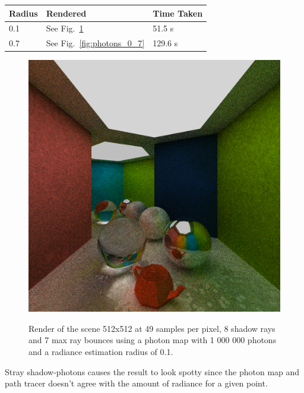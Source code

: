 \documentclass[a4paper, twocolumn]{article}
\begin{document}
        \begin{table}[H]
            \centering
            \begin{tabular}{lll}
                \toprule
                \textbf{Radius}&\textbf{Rendered}&\textbf{Time Taken}\\
                \midrule
                0.1&See Fig.~\ref{fig:photons_0_1}&51.5 s\\
                0.7&See Fig.~\ref{fig:photons_0_7}&129.6 s\\
                \bottomrule
            \end{tabular}
            \label{tab:photon_mapping}
            \end{table}

            \begin{figure}[H]
                \centering
                \caption{Render of the scene 512x512 at 49 samples per pixel, 8 shadow rays and 7 max ray bounces using a photon map with 1 000 000 photons and a radiance estimation radius of 0.1.}
                \includegraphics[width=0.8\linewidth]{share/results/photons_0_1.png}
                \label{fig:photons_0_1}
            \end{figure}

            Stray shadow-photons causes the result to look spotty since the photon map and path tracer doesn't agree with the amount of radiance for a given point.
\end{document}
